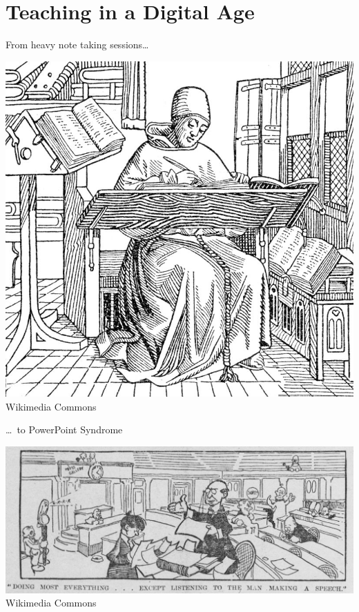 
\section{Teaching in a Digital Age}

\begin{frame}
  \centering
  From heavy note taking sessions\dots \\
  \begin{minipage}{0.55\linewidth}
    \includegraphics[width=\linewidth,keepaspectratio]{796px-Monkcopyistwoodcut} \\
    \tiny Wikimedia Commons
  \end{minipage}
\end{frame}

\begin{frame}
  \centering
  \dots\ to PowerPoint Syndrome \\
  \begin{minipage}{\linewidth}
    \includegraphics[width=\linewidth,keepaspectratio]{Satterfield_watches_Congress_be_boring} \\
    \tiny Wikimedia Commons
  \end{minipage}
\end{frame}

